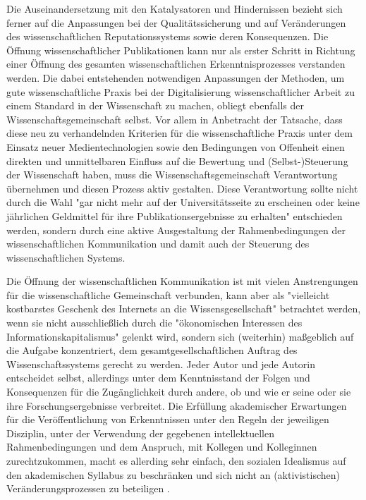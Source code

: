 Die Auseinandersetzung mit den Katalysatoren und Hindernissen bezieht sich ferner auf die Anpassungen bei der Qualitätssicherung und auf Veränderungen des wissenschaftlichen Reputationssystems sowie deren Konsequenzen. Die Öffnung wissenschaftlicher Publikationen kann nur als erster Schritt in Richtung einer Öffnung des gesamten wissenschaftlichen Erkenntnisprozesses verstanden werden. Die dabei entstehenden notwendigen Anpassungen der Methoden, um gute wissenschaftliche Praxis bei der Digitalisierung wissenschaftlicher Arbeit zu einem Standard in der Wissenschaft zu machen, obliegt ebenfalls der Wissenschaftsgemeinschaft selbst. Vor allem in Anbetracht der Tatsache, dass diese neu zu verhandelnden Kriterien für die wissenschaftliche Praxis unter dem Einsatz neuer Medientechnologien sowie den Bedingungen von Offenheit einen direkten und unmittelbaren Einfluss auf die Bewertung und (Selbst-)Steuerung der Wissenschaft haben, muss die Wissenschaftsgemeinschaft Verantwortung übernehmen und diesen Prozess aktiv gestalten. Diese Verantwortung sollte nicht durch die Wahl "gar nicht mehr auf der Universitätsseite zu erscheinen oder keine jährlichen Geldmittel für ihre Publikationsergebnisse zu erhalten" \cite{Warnke_2012} entschieden werden, sondern durch eine aktive Ausgestaltung der Rahmenbedingungen der wissenschaftlichen Kommunikation und damit auch der Steuerung des wissenschaftlichen Systems.

Die Öffnung der wissenschaftlichen Kommunikation ist mit vielen Anstrengungen für die wissenschaftliche Gemeinschaft verbunden, kann aber als "vielleicht kostbarstes Geschenk des Internets an die Wissensgesellschaft" betrachtet werden, wenn sie nicht ausschließlich durch die "ökonomischen Interessen des Informationskapitalismus" \cite{Hagner_2015} gelenkt wird, sondern sich (weiterhin) maßgeblich auf die Aufgabe konzentriert, dem gesamtgesellschaftlichen Auftrag des Wissenschaftssystems gerecht zu werden. Jeder Autor und jede Autorin entscheidet selbst, allerdings unter dem Kenntnisstand der Folgen und Konsequenzen für die Zugänglichkeit durch andere, ob und wie er seine oder sie ihre Forschungsergebnisse verbreitet. Die Erfüllung akademischer Erwartungen für die Veröffentlichung von Erkenntnissen unter den Regeln der jeweiligen Disziplin, unter der Verwendung der gegebenen intellektuellen Rahmenbedingungen und dem Anspruch, mit Kollegen und Kolleginnen zurechtzukommen, macht es allerding sehr einfach, den sozialen Idealismus auf den akademischen Syllabus zu beschränken und sich nicht an (aktivistischen) Veränderungsprozessen zu beteiligen \cite[:25]{Flood_2013}.

